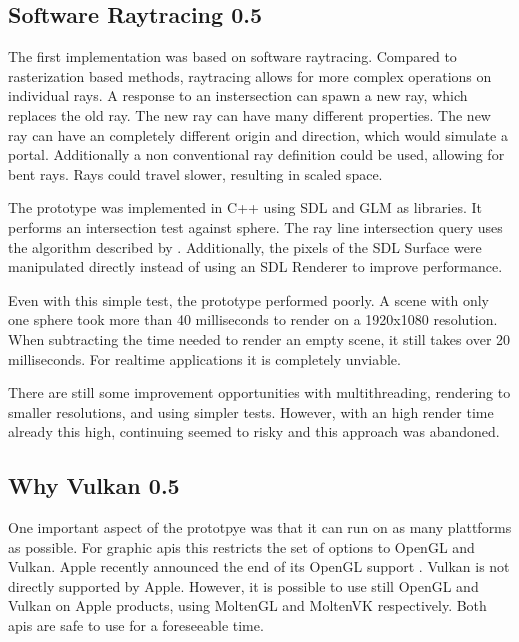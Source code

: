 \subsection{Software Raytracing 0.5}
The first implementation was based on software raytracing. Compared to rasterization based methods, raytracing allows for more complex operations on individual rays. A response to an instersection can spawn a new ray, which replaces the old ray. The new ray can have many different properties. The new ray can have an completely different origin and direction, which would simulate a portal. Additionally a non conventional ray definition could be used, allowing for bent rays. Rays could travel slower, resulting in scaled space.

The prototype was implemented in C++ using SDL \cite{SDL} and GLM \cite{GLM} as libraries. It performs an intersection test against sphere. The ray line intersection query uses the algorithm described by \textcite{eberly:2006:3d}. Additionally, the pixels of the SDL Surface were manipulated directly instead of using an SDL Renderer to improve performance.

Even with this simple test, the prototype performed poorly. A scene with only one sphere took more than 40 milliseconds to render on a 1920x1080 resolution. When subtracting the time needed to render an empty scene, it still takes over 20 milliseconds. For realtime applications it is completely unviable.

There are still some improvement opportunities with multithreading, rendering to smaller resolutions, and using simpler tests. However, with an high render time already this high, continuing seemed to risky and this approach was abandoned.


\subsection{Why Vulkan 0.5}
One important aspect of the prototpye was that it can run on as many plattforms as possible. %
For graphic \glspl{api} this restricts the set of options to OpenGL and Vulkan. Apple recently announced the end of its OpenGL support \cite{arstechnica:openGL}. Vulkan is not directly supported by Apple. However, it is possible to use still OpenGL and Vulkan on Apple products, using MoltenGL \cite{moltenGL} and MoltenVK \cite{moltenVK} respectively. Both \glspl{api} are safe to use for a foreseeable time.

